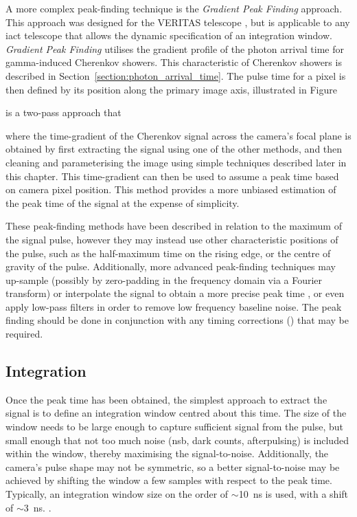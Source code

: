 A more complex peak-finding technique is the \textit{Gradient Peak Finding} approach. This approach was designed for the VERITAS telescope \cite{Holder2005}\cite{Cogan2006}\cite{Cogan2007}, but is applicable to any \gls{iact} telescope that allows the dynamic specification of an integration window. \textit{Gradient Peak Finding} utilises the gradient profile of the photon arrival time for gamma-induced Cherenkov showers. This characteristic of Cherenkov showers is described in Section~\ref{section:photon_arrival_time}. The pulse time for a pixel is then defined by its position along the primary image axis, illustrated in Figure~


is a two-pass approach that 

where the time-gradient of the Cherenkov signal across the camera's focal plane is obtained by first extracting the signal using one of the other methods, and then cleaning and parameterising the image using simple techniques described later in this chapter. This time-gradient can then be used to assume a peak time based on camera pixel position. This method provides a more unbiased estimation of the peak time of the signal at the expense of simplicity. 

These peak-finding methods have been described in relation to the maximum of the signal pulse, however they may instead use other characteristic positions of the pulse, such as the half-maximum time on the rising edge, or the centre of gravity of the pulse. Additionally, more advanced peak-finding techniques may up-sample (possibly by zero-padding in the frequency domain via a Fourier transform) or interpolate the signal to obtain a more precise peak time \cite{Cogan2006}\cite{Cogan2007}, or even apply low-pass filters in order to remove low frequency baseline noise. The peak finding should be done in conjunction with any timing corrections () that may be required.


\subsection{Integration}

Once the peak time has been obtained, the simplest approach to extract the signal is to define an integration window centred about this time. The size of the window needs to be large enough to capture sufficient signal from the pulse, but small enough that not too much noise (\gls{nsb}, dark counts, afterpulsing) is included within the window, thereby maximising the signal-to-noise. Additionally, the camera's pulse shape may not be symmetric, so a better signal-to-noise may be achieved by shifting the window a few samples with respect to the peak time. Typically, an integration window size on the order of $\sim$10~ns is used, with a shift of $\sim$3~ns.  .

